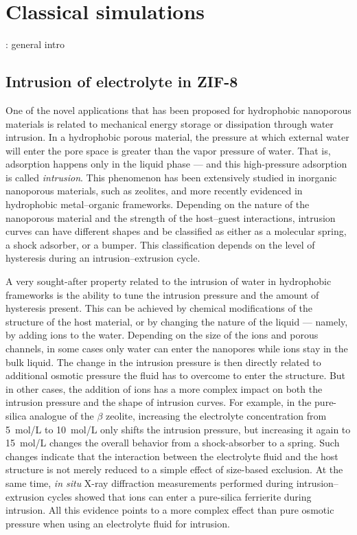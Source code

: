 \documentclass[thesis]{subfiles}
\begin{document}
\OnlyInSubfile{\setcounter{chapter}{4}}
\chapter{Classical simulations}

\TODO: general intro

\newpage
\section{Intrusion of electrolyte in ZIF-8}

One of the novel applications that has been proposed for hydrophobic nanoporous
materials is related to mechanical energy storage or dissipation through water
intrusion\cite{Eroshenko2001, Soulard2004}. In a hydrophobic porous material,
the pressure at which external water will enter the pore space is greater than
the vapor pressure of water. That is, adsorption happens only in the liquid
phase --- and this high-pressure adsorption is called
\emph{intrusion}\cite{Fraux2017}. This phenomenon has been extensively studied
in inorganic nanoporous materials, such as zeolites\cite{Saada2010,
Desbiens2005, Humplik2014a, Humplik2014b}, and more recently evidenced in
hydrophobic metal--organic frameworks\cite{Ortiz2013, Grosu2015,
MichelinJamois2015}. Depending on the nature of the nanoporous material and the
strength of the host--guest interactions, intrusion curves can have different
shapes and be classified as either as a molecular spring, a shock adsorber, or a
bumper. This classification depends on the level of hysteresis during an
intrusion--extrusion cycle.

A very sought-after property related to the intrusion of water in hydrophobic
frameworks is the ability to tune the intrusion pressure and the amount of
hysteresis present. This can be achieved by chemical modifications of the
structure of the host material\cite{AOrtiz2014}, or by changing the nature of
the liquid --- namely, by adding ions to the water\cite{Ortiz2014}. Depending on
the size of the ions and porous channels, in some cases only water can enter the
nanopores while ions stay in the bulk liquid. The change in the intrusion
pressure is then directly related to additional osmotic pressure the fluid has
to overcome to enter the structure\cite{MichelinJamois2015}. But in other cases,
the addition of ions has a more complex impact on both the intrusion pressure
and the shape of intrusion curves. For example, in the pure-silica analogue of
the $\beta$ zeolite\cite{Camblor1996}, increasing the electrolyte concentration
from \SI{5}{mol/L} to \SI{10}{mol/L} only shifts the intrusion pressure, but
increasing it again to \SI{15}{mol/L} changes the overall behavior from a
shock-absorber to a spring\cite{Ryzhikov2014}. Such changes indicate that the
interaction between the electrolyte fluid and the host structure is not merely
reduced to a simple effect of size-based exclusion. At the same time, \emph{in
situ} X-ray diffraction measurements performed during intrusion--extrusion
cycles showed that  ions can enter a pure-silica ferrierite during
intrusion\cite{Arletti2016}. All this evidence points to a more complex effect
than pure osmotic pressure when using an electrolyte fluid for intrusion.
\end{document}
